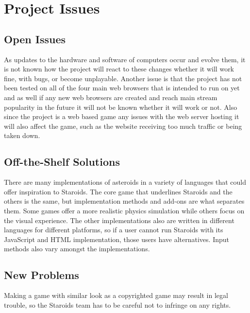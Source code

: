 \documentclass[12pt, titlepage]{article}
\begin{document}

\section{Project Issues}

\subsection{Open Issues}
As updates to the hardware and software of computers occur and evolve them, it is not known how the project will react to these changes whether it will work fine, with bugs, or become unplayable. Another issue is that the project has not been tested on all of the four main web browsers that is intended to run on yet and as well if any new web browsers are created and reach main stream popularity in the future it will not be known whether it will work or not. Also since the project is a web based game any issues with the web server hosting it will also affect the game, such as the website receiving too much traffic or being taken down.\\

\subsection{Off-the-Shelf Solutions}
There are many implementations of asteroids in a variety of languages that could offer inspiration to Staroids. The core game that underlines Staroids and the others is the same, but implementation methods and add-ons are what separates them. Some games offer a more realistic physics simulation while others focus on the visual experience. The other implementations also are written in different languages for different platforms, so if a user cannot run Staroids with its JavaScript and HTML implementation, those users have alternatives. Input methods also vary amongst the implementations.\\

\subsection{New Problems}
Making a game with similar look as a copyrighted game may result in legal trouble, so the Staroids team has to be careful not to infringe on any rights.\\
\end{document}

